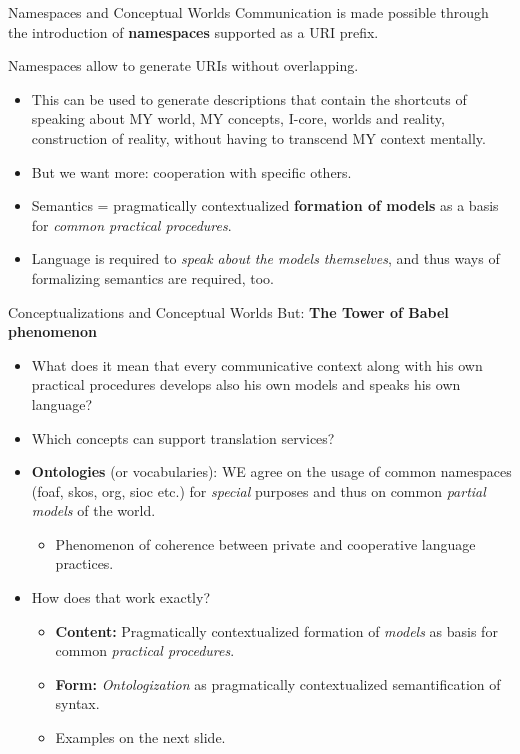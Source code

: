\documentclass{beamer}
\begin{document}
\begin{frame}{Namespaces and Conceptual Worlds}
Communication is made possible through the introduction of \textbf{namespaces}
supported as a URI prefix.

Namespaces allow to generate URIs without overlapping.
\begin{itemize}
\item This can be used to generate descriptions that contain the shortcuts of
  speaking about MY world, MY concepts, I-core, worlds and reality,
  construction of reality, without having to transcend MY context mentally.
\item But we want more: cooperation with specific others.
\item Semantics = pragmatically contextualized \textbf{formation of models} as
  a basis for \emph{common practical procedures}.
\item Language is required to \emph{speak about the models themselves},
  and thus ways of formalizing semantics are required, too.
\end{itemize}
\end{frame}

\begin{frame}{Conceptualizations and Conceptual Worlds}
But: \textbf{The Tower of Babel phenomenon}
\begin{itemize}
\item What does it mean that every communicative context along with his own
  practical procedures develops also his own models and speaks his own
  language?
\item Which concepts can support translation services?
\item \textbf{Ontologies} (or vocabularies): WE agree on the usage of common
  namespaces (foaf, skos, org, sioc etc.) for \emph{special} purposes and thus
  on common \emph{partial models} of the world.
  \begin{itemize}
  \item Phenomenon of coherence between private and cooperative language
    practices.
  \end{itemize}
\item How does that work exactly?
  \begin{itemize}
  \item \textbf{Content:} Pragmatically contextualized formation of
    \emph{models} as basis for common \emph{practical procedures}.
  \item \textbf{Form:} \emph{Ontologization} as pragmatically contextualized
    semantification of syntax.
  \item Examples on the next slide.
  \end{itemize}
\end{itemize}
\end{frame}
\end{document}
